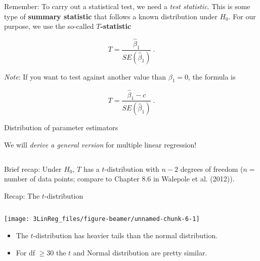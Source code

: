\documentclass[10pt,ignorenonframetext,]{beamer}
\providecommand{\tightlist}{%
  \setlength{\itemsep}{0pt}\setlength{\parskip}{0pt}}
\begin{document}
\begin{frame}

Remember: To carry out a statistical test, we need a \emph{test
statistic}. This is some type of \textbf{summary statistic} that follows
a known distribution under \(H_0\). For our purpose, we use the
so-called \textbf{\(T\)-statistic}

\begin{equation*}\label{eq:beta}
T=\frac{\hat\beta_1 }{SE(\hat\beta_1)}\ . 
\end{equation*}

\vspace{4mm}

\emph{Note}: If you want to test against another value than
\(\beta_1=0\), the formula is

\begin{equation*}
T=\frac{\hat\beta_1 - c}{SE(\hat\beta_1)} \ .
\end{equation*}

\end{frame}

\begin{frame}

\begin{block}{Distribution of parameter estimators}

\vspace{2mm}

We will \emph{derive a general version} for multiple linear regression!

\(~\)

Brief recap: Under \(H_0\), \(T\) has a \(t\)-distribution with \(n-2\)
degrees of freedom (\(n=\) number of data points; compare to Chapter 8.6
in Walepole et al. (2012)).

\end{block}

\end{frame}

\begin{frame}

\begin{block}{Recap: The \(t\)-distribution}

\(~\)

\begin{center}\texttt{[image: 3LinReg\_files/figure-beamer/unnamed-chunk-6-1]} \end{center}

\normalsize

\begin{itemize}
\tightlist
\item
  The \(t\)-distribution has heavier tails than the normal distribution.
\item
  For df \(\geq 30\) the \(t\) and Normal distribution are pretty
  similar.
\end{itemize}

\end{block}

\end{frame}
\end{document}
